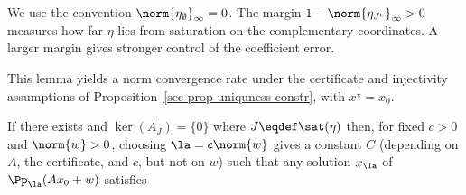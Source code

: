 We use the convention $\norm{\eta_\emptyset}_\infty=0$. The margin $1-\norm{\eta_{J^c}}_\infty>0$ measures how far $\eta$ lies from saturation on the complementary coordinates. A larger margin gives stronger control of the coefficient error.

This lemma yields a norm convergence rate under the certificate and injectivity assumptions of Proposition~\ref{sec-prop-uniquness-constr}, with $x^\star=x_0$.

\begin{thm}\label{thm-linrate-l1}
	If there exists 
	and $\ker(A_{J})=\{0\}$ where
	$J \eqdef \sat(\eta)$ then, for fixed $c>0$ and $\norm{w}>0$, choosing $\la=c\norm{w}$ gives a constant $C$ (depending on $A$, the certificate, and $c$, but not on $w$) such that any solution $x_\la$ of $\Pp_\la(Ax_0+w)$ satisfies
\end{thm}
